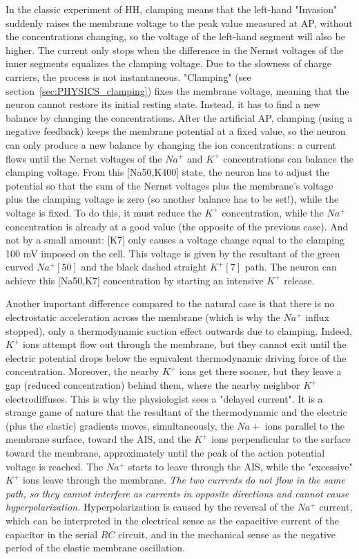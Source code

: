 In the classic experiment of \gls{HH}, clamping means that the left-hand "Invasion" suddenly raises the membrane voltage to the peak value measured at \gls{AP}, without the concentrations changing, so the voltage of the left-hand segment will also be higher.
The current only stops when the difference in the Nernst voltages of the inner segments equalizes
the clamping voltage. Due to the slowness of charge carriers, the process is not instantaneous.
"Clamping" (see section~\ref{sec:PHYSICS_clamping}) fixes the membrane voltage, meaning that the neuron cannot restore its initial
resting state. Instead, it has to find a new balance by changing the concentrations.
After the artificial \gls{AP}, clamping (using a negative feedback) keeps the membrane potential at a fixed value, so the neuron can only produce a new balance by changing the ion concentrations: a current flows until the Nernst voltages of the $Na^+$ and $K^+$ concentrations can balance the clamping voltage.
From this [Na50,K400] state, the neuron has to adjust the potential so that the sum of the Nernst voltages plus the membrane's voltage plus the clamping voltage is zero (so another balance has to be set!), while the voltage is fixed.
To do this, it must reduce the $K^+$ concentration, while the $Na^+$ concentration is already at a good value (the opposite of the previous case). And not by a small amount: [K7] only causes a voltage change equal to the clamping 100 mV imposed on the cell.
This voltage is given by the resultant of the green curved $Na^+[50]$ and the black dashed straight
$K^+[7]$ path. The neuron can achieve this [Na50,K7] concentration
by starting an intensive $K^+$ release.

Another important difference compared to the natural case is that there is no electrostatic acceleration across the membrane (which is why the $Na^+$ influx stopped),
only a thermodynamic suction effect outwards due to clamping.
Indeed, $K^+$ ions attempt flow out through the membrane, but
they cannot exit until the electric potential drops
below the equivalent thermodynamic driving force of the concentration.
Moreover, the nearby $K^+$ ions get there sooner, but they leave a gap (reduced concentration) behind them, where the nearby neighbor $K^+$ electrodiffuses. This is why the physiologist sees a "delayed current".
It is a strange game of nature that the resultant of the thermodynamic and the electric  (plus the elastic)  gradients moves, simultaneously, the $Na+$ ions parallel to the membrane surface, toward the \gls{AIS}, and
the $K^+$ ions perpendicular to the surface toward the membrane,
approximately until the peak of the action potential voltage is reached.
The $Na^+$ starts to leave through the \gls{AIS}, while the "excessive" $K^+$ ions leave through the membrane.
\textit{The two currents do not flow in the same path, so they cannot
interfere as currents in opposite directions and cannot cause hyperpolarization.}
Hyperpolarization is caused by the reversal of the $Na^+$ current, which can be interpreted
in the electrical sense as the capacitive current of the capacitor in the serial $RC$ circuit, and
in the mechanical sense as the negative period of the elastic membrane oscillation.

